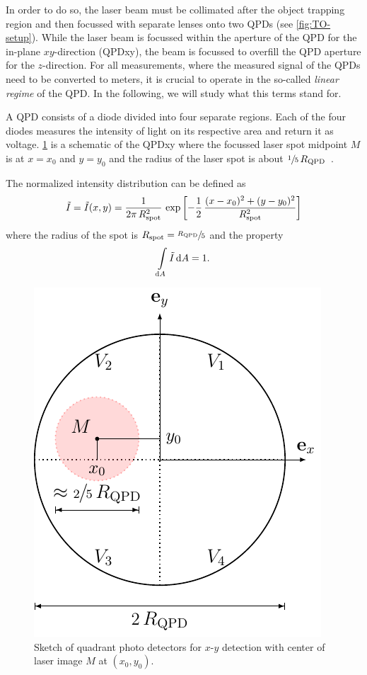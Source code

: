 In order to do so, the laser beam must be collimated after the object trapping 
region and then focussed with separate lenses onto two QPDs (see 
\cref{fig:TO-setup}). While the laser beam is focussed within the aperture of 
the QPD for the in-plane $xy$-direction (QPDxy), the beam is focussed to 
overfill the QPD aperture for the $z$-direction. For all measurements, where 
the measured signal of the QPDs need to be converted to meters, it is crucial 
to operate in the so-called \emph{linear regime} of the QPD. In the following, 
we will study what this terms stand for.

A QPD consists of a diode divided into four separate regions. Each of the four 
diodes measures the intensity of light on its respective area and return it as 
voltage. \cref{fig:TO-QPD} is a schematic of the QPDxy where the focussed laser 
spot midpoint $M$ is at $x=x_{0}$ and $y=y_{0}$ and the radius of the laser 
spot is about $\sfrac{1}{5}\,R_{\mathrm{QPD}}$~\cite{Lamprecht2017}.

The normalized intensity distribution can be defined as
\begin{equation}
  \tilde{I} = \tilde{I}(x, y) = 
  \frac{1}{2\pi\,R_{\mathrm{spot}}^{2}}\,\exp\left[ 
  -\frac{1}{2}\,\frac{(x-x_{0})^{2} + (y - y_{0})^{2}}{R_{\mathrm{spot}}^{2}} 
\right]
    \label{eq:TO-intensity}
\end{equation}
where the radius of the spot is $R_{\mathrm{spot}}=\sfrac{R_{\mathrm{QPD}}}{5}$ and the property 
\begin{equation}
  \int\limits_{\dd{A}}\tilde{I}\dd{A} = 1.
\end{equation}

\begin{figure}[tbp]
  \centering
  \includegraphics[]{Plots/cache/QPD.pdf}
  \caption{Sketch of quadrant photo detectors for $x$-$y$ detection with center 
  of laser image $M$ at $(x_{0}, y_{0})$.}
  \label{fig:TO-QPD}
\end{figure}

